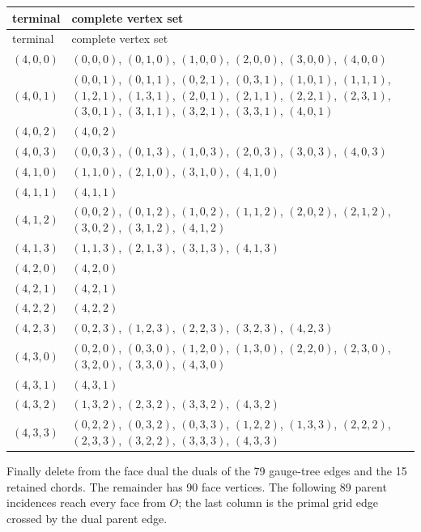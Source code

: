 \begin{longtable}{@{}p{}p{}@{}}
\toprule terminal & complete vertex set\\ \midrule
\endfirsthead \toprule terminal & complete vertex set\\ \midrule \endhead
$(4,0,0)$ & $(0,0,0)$, $(0,1,0)$, $(1,0,0)$, $(2,0,0)$, $(3,0,0)$, $(4,0,0)$\\
$(4,0,1)$ & $(0,0,1)$, $(0,1,1)$, $(0,2,1)$, $(0,3,1)$, $(1,0,1)$, $(1,1,1)$, $(1,2,1)$, $(1,3,1)$, $(2,0,1)$, $(2,1,1)$, $(2,2,1)$, $(2,3,1)$, $(3,0,1)$, $(3,1,1)$, $(3,2,1)$, $(3,3,1)$, $(4,0,1)$\\
$(4,0,2)$ & $(4,0,2)$\\
$(4,0,3)$ & $(0,0,3)$, $(0,1,3)$, $(1,0,3)$, $(2,0,3)$, $(3,0,3)$, $(4,0,3)$\\
$(4,1,0)$ & $(1,1,0)$, $(2,1,0)$, $(3,1,0)$, $(4,1,0)$\\
$(4,1,1)$ & $(4,1,1)$\\
$(4,1,2)$ & $(0,0,2)$, $(0,1,2)$, $(1,0,2)$, $(1,1,2)$, $(2,0,2)$, $(2,1,2)$, $(3,0,2)$, $(3,1,2)$, $(4,1,2)$\\
$(4,1,3)$ & $(1,1,3)$, $(2,1,3)$, $(3,1,3)$, $(4,1,3)$\\
$(4,2,0)$ & $(4,2,0)$\\
$(4,2,1)$ & $(4,2,1)$\\
$(4,2,2)$ & $(4,2,2)$\\
$(4,2,3)$ & $(0,2,3)$, $(1,2,3)$, $(2,2,3)$, $(3,2,3)$, $(4,2,3)$\\
$(4,3,0)$ & $(0,2,0)$, $(0,3,0)$, $(1,2,0)$, $(1,3,0)$, $(2,2,0)$, $(2,3,0)$, $(3,2,0)$, $(3,3,0)$, $(4,3,0)$\\
$(4,3,1)$ & $(4,3,1)$\\
$(4,3,2)$ & $(1,3,2)$, $(2,3,2)$, $(3,3,2)$, $(4,3,2)$\\
$(4,3,3)$ & $(0,2,2)$, $(0,3,2)$, $(0,3,3)$, $(1,2,2)$, $(1,3,3)$, $(2,2,2)$, $(2,3,3)$, $(3,2,2)$, $(3,3,3)$, $(4,3,3)$\\
\bottomrule
\end{longtable}
Finally delete from the face dual the duals of the 79 gauge-tree edges and the 15 retained chords.  The remainder has 90 face vertices.  The following 89 parent incidences reach every face from $O$; the last column is the primal grid edge crossed by the dual parent edge.
